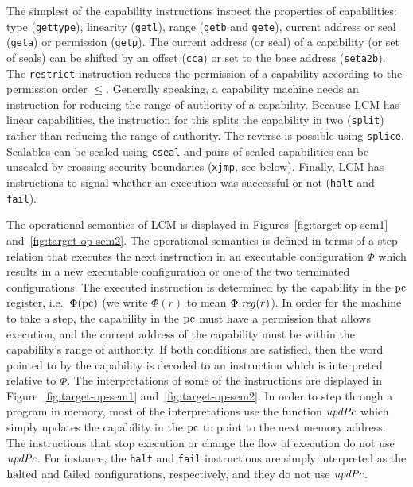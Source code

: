 \documentclass{jfp}
\renewcommand{\updPcAddr}[1]{\plainfun{updPc}{#1}}
\newcommand{\trgcm}{\textsc{LCM}}
\begin{document}
The simplest of the capability instructions inspect the properties of capabilities: type (\texttt{gettype}), linearity (\texttt{getl}), range (\texttt{getb} and \texttt{gete}), current address or seal (\texttt{geta}) or permission (\texttt{getp}).
The current address (or seal) of a capability (or set of seals) can be shifted by an offset (\texttt{cca}) or set to the base address (\texttt{seta2b}).
The \texttt{restrict} instruction reduces the permission of a capability according to the permission order $\le$.
Generally speaking, a capability machine needs an instruction for reducing the range of authority of a capability.
Because \trgcm{} has linear capabilities, the instruction for this splits the capability in two (\texttt{split}) rather than reducing the range of authority.
The reverse is possible using \texttt{splice}.
Sealables can be sealed using \texttt{cseal} and pairs of sealed capabilities can be unsealed by crossing security boundaries (\texttt{xjmp}, see below).
Finally, \trgcm{} has instructions to signal whether an execution was successful or not (\texttt{halt} and \texttt{fail}).

The operational semantics of \trgcm{} is displayed in
Figures~\ref{fig:target-op-sem1} and~\ref{fig:target-op-sem2}.
The operational semantics is defined in terms of a step relation that executes the next instruction in an executable configuration $\Phi$ which results in a new executable configuration or one of the two terminated configurations.
The executed instruction is determined by the capability in the $\mathrm{pc}$ register, i.e.\ $\Phi(\mathrm{pc})$ (we write $\Phi(r)$ to mean $\Phi.\reg(r)$).
In order for the machine to take a step, the capability in the $\mathrm{pc}$ must have a permission that allows execution, and the current address of the capability must be within the capability's range of authority.
If both conditions are satisfied, then the word pointed to by the capability is decoded to an instruction which is interpreted relative to $\Phi$.
The interpretations of some of the instructions are displayed in
Figure~\ref{fig:target-op-sem1} and~\ref{fig:target-op-sem2}.
In order to step through a program in memory, most of the interpretations use the function $\updPcAddr{}$ which simply updates the capability in the $\mathrm{pc}$ to point to the next memory address.
The instructions that stop execution or change the flow of execution do not use $\updPcAddr{}$.
For instance, the \texttt{halt} and \texttt{fail} instructions are simply interpreted as the $\mathrm{halted}$ and $\mathrm{failed}$ configurations, respectively, and they do not use $\updPcAddr{}$.
\end{document}
